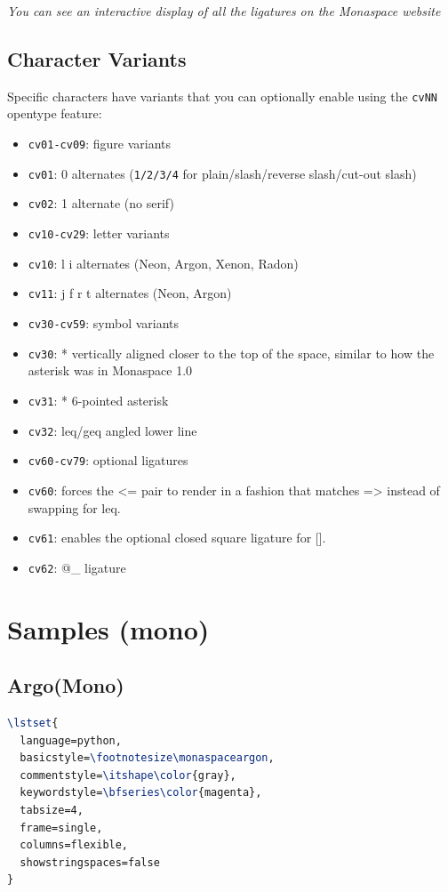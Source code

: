 \documentclass[a4paper]{scrartcl}
\newcommand*{\opt}[1]{\texttt{#1}}
\begin{document}
\textit{You can see an interactive display of all the ligatures on the Monaspace website}

\subsection{Character Variants}

Specific characters have variants that you can optionally enable using the \opt{cvNN} opentype feature:

\begin{itemize}
	\item \opt{cv01-cv09}: figure variants
	\item \opt{cv01}: 0 alternates (\opt{1/2/3/4} for plain/slash/reverse slash/cut-out slash)
	\item \opt{cv02}: 1 alternate (no serif)
	\item \opt{cv10-cv29}: letter variants
	\item \opt{cv10}: l i alternates (Neon, Argon, Xenon, Radon)
	\item \opt{cv11}: j f r t alternates (Neon, Argon)
	\item \opt{cv30-cv59}: symbol variants
	\item \opt{cv30}: * vertically aligned closer to the top of the space, similar to how the asterisk was in Monaspace 1.0
	\item \opt{cv31}: * 6-pointed asterisk
	\item \opt{cv32}: leq/geq angled lower line
	\item \opt{cv60-cv79}: optional ligatures
	\item \opt{cv60}: forces the <= pair to render in a fashion that matches => instead of swapping for leq.
	\item \opt{cv61}: enables the optional closed square ligature for [].
	\item \opt{cv62}: @\_ ligature
\end{itemize}

\pagebreak

\section{Samples (mono)}

\subsection{Argo(Mono)}

\begin{lstlisting}[language=TeX,basicstyle=\footnotesize\monaspaceargon,commentstyle=\itshape\color{gray},keywordstyle=\bfseries\color{blue},tabsize=4,frame=single,columns=flexible,showstringspaces=false]
\lstset{
  language=python,
  basicstyle=\footnotesize\monaspaceargon,
  commentstyle=\itshape\color{gray},
  keywordstyle=\bfseries\color{magenta},
  tabsize=4,
  frame=single,
  columns=flexible,
  showstringspaces=false
}
\end{lstlisting}
\end{document}
